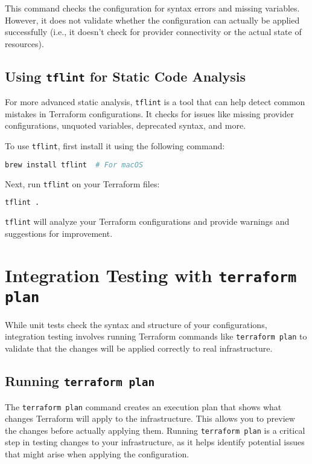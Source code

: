 This command checks the configuration for syntax errors and missing variables. However, it does not validate whether the configuration can actually be applied successfully (i.e., it doesn't check for provider connectivity or the actual state of resources).

\subsection{Using \texttt{tflint} for Static Code Analysis}

For more advanced static analysis, \texttt{tflint} is a tool that can help detect common mistakes in Terraform configurations. It checks for issues like missing provider configurations, unquoted variables, deprecated syntax, and more.

To use \texttt{tflint}, first install it using the following command:

\begin{lstlisting}[language=bash]
brew install tflint  # For macOS
\end{lstlisting}

Next, run \texttt{tflint} on your Terraform files:

\begin{lstlisting}[language=bash]
tflint .
\end{lstlisting}

\texttt{tflint} will analyze your Terraform configurations and provide warnings and suggestions for improvement.

\section{Integration Testing with \texttt{terraform plan}}

While unit tests check the syntax and structure of your configurations, integration testing involves running Terraform commands like \texttt{terraform plan} to validate that the changes will be applied correctly to real infrastructure.

\subsection{Running \texttt{terraform plan}}

The \texttt{terraform plan} command creates an execution plan that shows what changes Terraform will apply to the infrastructure. This allows you to preview the changes before actually applying them. Running \texttt{terraform plan} is a critical step in testing changes to your infrastructure, as it helps identify potential issues that might arise when applying the configuration.

